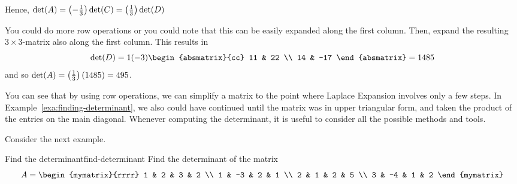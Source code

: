 \begin{solution}
Hence, $\det (A) = \left(-\frac{1}{3}\right) \det (C) = \left(\frac{1}{3}\right) \det (D)$ 

You could do more row operations or you could note that this can be easily
expanded along the first column. Then, expand the resulting $3 \times 3$-matrix
also along the first column. This results in 
\begin{equation*}
\det (D) =1(-3) \begin{absmatrix}{cc}
11 & 22 \\
14 & -17
\end{absmatrix}= 1485
\end{equation*}
and so  $\det (A) =\left(\frac{1}{3}\right) (1485)
=495$.
\end{solution} 

You can see that by using row operations, we can simplify a matrix
to the point where Laplace Expansion involves only a few steps. In Example~\ref{exa:finding-determinant}, we also could have continued until the matrix was in 
upper triangular form, and taken the product of the entries on the main diagonal. Whenever 
computing the determinant, it is useful to consider all the possible methods and tools.

Consider the next example.

\begin{example}{Find the determinant}{find-determinant}
Find the determinant of the matrix
\begin{equation*}
A = \begin{mymatrix}{rrrr}
1 & 2 & 3 & 2 \\
1 & -3 & 2 & 1 \\
2 & 1 & 2 & 5 \\
3 & -4 & 1 & 2
\end{mymatrix}
\end{equation*}
\end{example}

